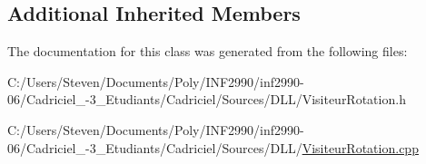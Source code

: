 \subsection*{Additional Inherited Members}


The documentation for this class was generated from the following files\+:\begin{DoxyCompactItemize}
\item 
C\+:/\+Users/\+Steven/\+Documents/\+Poly/\+I\+N\+F2990/inf2990-\/06/\+Cadriciel\+\_-\/3\+\_\+\+Etudiants/\+Cadriciel/\+Sources/\+D\+L\+L/Visiteur\+Rotation.\+h\item 
C\+:/\+Users/\+Steven/\+Documents/\+Poly/\+I\+N\+F2990/inf2990-\/06/\+Cadriciel\+\_-\/3\+\_\+\+Etudiants/\+Cadriciel/\+Sources/\+D\+L\+L/\hyperlink{_visiteur_rotation_8cpp}{Visiteur\+Rotation.\+cpp}\end{DoxyCompactItemize}
